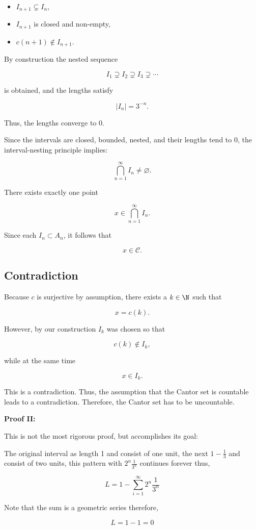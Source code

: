 \begin{itemize}

	\item \(I_{n+1} \subsetneq I_{n}\),

	\item \(I_{n+1}\) is closed and non-empty,

	\item \(c(n+1) \notin I_{n+1}\).

\end{itemize}


By construction the nested sequence

\[
	I_{1} \supsetneq I_{2} \supsetneq I_{3} \supsetneq \cdots
\]

is obtained, and the lengths satisfy

\[
	|I_{n}| = 3^{-n}.
\]

Thus, the lengths converge to \(0\).


Since the intervals are closed, bounded, nested, and their lengths tend to \(0\), the interval-nesting principle implies:

\[
	\bigcap_{n=1}^{\infty} I_{n} \neq \varnothing.
\]

There exists exactly one point

\[
	x \in \bigcap_{n=1}^{\infty} I_{n}.
\]

Since each \(I_{n} \subset A_{n}\), it follows that

\[
	x \in \mathcal{C}.
\]

\subsection*{Contradiction}

Because \(c\) is surjective by assumption, there exists a \(k \in \N\) such that

\[
	x = c(k).
\]

However, by our construction \(I_{k}\) was chosen so that

\[
	c(k) \notin I_{k},
\]

while at the same time

\[
	x \in I_{k}.
\]

This is a contradiction. Thus, the assumption that the Cantor set is countable leads to a contradiction.
Therefore, the Cantor set has to be uncountable.

\QED 

\textbf{Proof II:}

This is not the most rigorous proof, but accomplishes its goal:

The original interval as length 1 and consist of one unit, the next \(1 - \frac{1}{3}\) and consist of two units, this pattern with 
\(2^n \frac{1}{3^n}\) continues forever thus, 

\[
	L = 1 - \sum_{i = 1}^{\infty} 2^n \frac{1}{3^n}
\]

Note that the sum is a geometric series therefore, 

\[
	L = 1 - 1 = 0
\]

\QED


